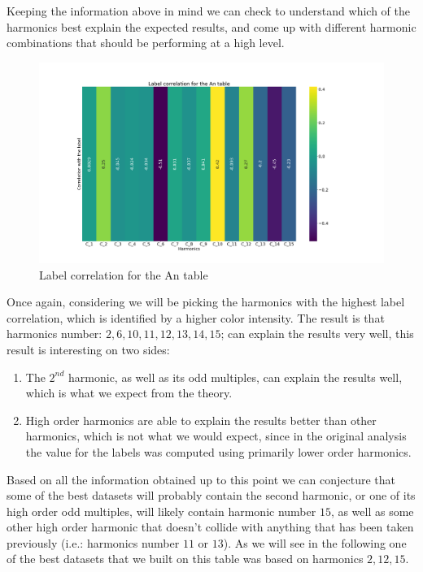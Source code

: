 Keeping the information above in mind we can check  to understand which of the
harmonics best explain the expected results, and come up with different harmonic combinations that
should be performing at a high level.

\begin{figure}
	\centering
	\includegraphics[scale=.25]{img/An_label_corr.png}
	\caption{Label correlation for the An table} \label{fig:an-lcorr}
\end{figure}

Once again, considering  we will be picking the harmonics with the highest label
correlation, which is identified by a higher color intensity. The result
is that harmonics number: $2, 6, 10, 11, 12, 13, 14, 15$; can explain the results very well, this
result is interesting on two sides:
\begin{enumerate}
	\item The $2^{nd}$ harmonic, as well as its odd multiples, can explain the results well, which
	      is what we expect from the theory.
	\item High order harmonics are able to explain the results better than other harmonics,
	      which is not what we would expect, since in the original analysis the value for the
	      labels was computed using primarily lower order harmonics.
\end{enumerate}
Based on all the information obtained up to this point we can conjecture that some of the best
datasets will probably contain the second harmonic, or one of its high order odd multiples, will
likely contain harmonic number $15$, as well as some other high order harmonic that doesn't collide
with anything that has been taken previously (i.e.: harmonics number $11$ or $13$). As we will see
in the following one of the best datasets that we built on this table was based on harmonics $2, 12,
	15$.

